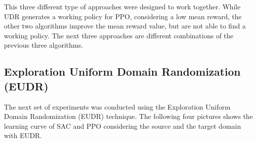 \documentclass[11pt]{article}
\begin{document}
This three different type of approaches were designed to work together. While UDR generates a working policy for PPO, considering a low mean reward, the other two algorithms improve the mean reward value, but are not able to find a working policy. The next three approaches are different combinations of the previous three algorithms.

\subsection{Exploration Uniform Domain Randomization (EUDR)}

The next set of experiments was conducted using the Exploration Uniform Domain Randomization (EUDR) technique. The following four pictures shows the learning curve of SAC and PPO considering the source and the target domain with EUDR.
\end{document}
